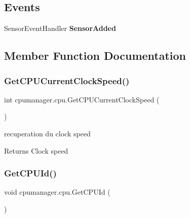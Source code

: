 \subsection*{Events}
\begin{DoxyCompactItemize}
\item 
\mbox{\label{classcpumanager_1_1cpu_a1ee069aad53d2d94bfd1bf9fec47ff5d}} 
Sensor\+Event\+Handler {\bfseries Sensor\+Added}
\end{DoxyCompactItemize}


\subsection{Member Function Documentation}
\mbox{\label{classcpumanager_1_1cpu_a90b14782baf800c618ee9f2ade46a632}} 
\subsubsection{\texorpdfstring{Get\+C\+P\+U\+Current\+Clock\+Speed()}{GetCPUCurrentClockSpeed()}}
{\footnotesize\ttfamily int cpumanager.\+cpu.\+Get\+C\+P\+U\+Current\+Clock\+Speed (\begin{DoxyParamCaption}{ }\end{DoxyParamCaption})}



recuperation du clock speed 

\begin{DoxyReturn}{Returns}
Clock speed
\end{DoxyReturn}
\mbox{\label{classcpumanager_1_1cpu_a644d7ec250526b11aae6325199d0d62d}} 
\subsubsection{\texorpdfstring{Get\+C\+P\+U\+Id()}{GetCPUId()}}
{\footnotesize\ttfamily void cpumanager.\+cpu.\+Get\+C\+P\+U\+Id (\begin{DoxyParamCaption}{ }\end{DoxyParamCaption})}



